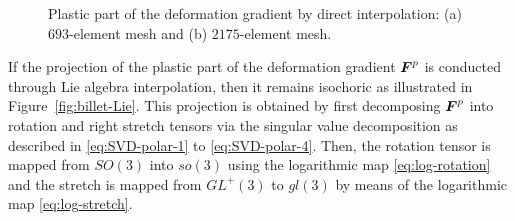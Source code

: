 \documentclass[12pt]{article}
\begin{document}
\begin{figure}[htbp]
  \begin{center}
    \unitlength=1.0mm
    \caption{Plastic part of the deformation gradient by  direct interpolation:
    (a) $693$-element mesh and (b) $2175$-element mesh.}
    \label{fig:billet-no-Lie}
  \end{center}
\end{figure}

If the projection of the plastic part of the deformation gradient ${\boldsymbol{F}}^{p}$ is
conducted through Lie algebra interpolation, then it remains isochoric as
illustrated in Figure~\ref{fig:billet-Lie}. This projection is obtained by first
decomposing ${\boldsymbol{F}}^{p}$ into rotation and right stretch tensors via the singular
value decomposition as described in \eqref{eq:SVD-polar-1} to
\eqref{eq:SVD-polar-4}. Then, the rotation tensor is mapped from $SO(3)$ into
$so(3)$ using the logarithmic map \eqref{eq:log-rotation} and the stretch is
mapped from $GL^{+}(3)$ to $gl(3)$ by means of the logarithmic map
\eqref{eq:log-stretch}.
\end{document}
